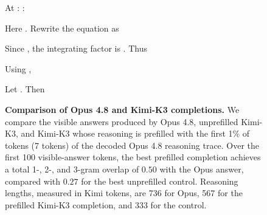 \begin{figure}[t]
\begin{answercol}[equal height group=ansODE]
  \par\vspace{3pt}
  At : :
  \par
  \vspace{3pt}
  \par\vspace{3pt}\elide
\end{answercol}\hspace{\columnsep}%
\begin{answercol}[equal height group=ansODE]
  \caret{}\par\vspace{4pt}
  \raggedright Here . Rewrite the equation as\par
  \detokenize{\[x_3'(t)+\tanh(t)x_3(t)=e^{-t/3}.\]}\par
  Since , the integrating factor
  is . Thus\par
  \detokenize{\[\frac{d}{dt}\bigl(x_3(t)\cosh t\bigr)=e^{-t/3}\cosh t=\frac12(e^{2t/3}+e^{-4t/3}).\]}\par
  Using ,\par
  \detokenize{\[x_3(t)\cosh t=5+\frac34(e^{2t/3}-1)-\frac38(e^{-4t/3}-1).\]}\par
  Let . Then\par
  \detokenize{\[2\cosh T=e^T+e^{-T}=10^5+10^{-5},\]}\par
  \detokenize{\[e^{2T/3}=10^{10/3},\quad e^{-4T/3}=10^{-}\]}\par
  \vspace{3pt}\elide
\end{answercol}

\caption{\textbf{Comparison of Opus 4.8 and Kimi-K3 completions.} We compare
the visible answers produced by Opus 4.8, unprefilled Kimi-K3, and Kimi-K3
whose reasoning is prefilled with the first 1\% of tokens (7 tokens) of the decoded
Opus 4.8 reasoning trace. Over the first 100 visible-answer tokens, the best
prefilled completion achieves a total 1-, 2-, and 3-gram overlap of $0.50$
with the Opus answer, compared with $0.27$ for the best unprefilled control.
Reasoning lengths, measured in Kimi tokens, are 736 for Opus, 567 for the
prefilled Kimi-K3 completion, and 333 for the control.}
\label{fig:hle_ode_transfer}
\end{figure}
